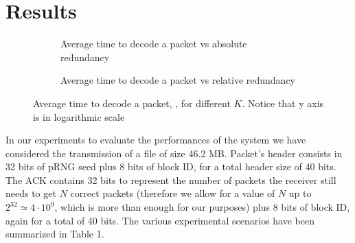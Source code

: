 \section{Results}\label{sec:results}
\setlength{\abovecaptionskip}{0pt plus 0pt minus 2pt}

\begin{figure}[t!]
\centering
\captionsetup{justification=centering,font=scriptsize}
\begin{subfigure}{0.4\textwidth}
	\captionsetup{justification=centering,font=scriptsize}
	\setlength{}
	\setlength{}
	
	\caption{Average time to decode a packet vs absolute redundancy}
	\label{fig:decoding_time}
\end{subfigure}\hspace{2em}%
\begin{subfigure}{0.4\textwidth}
	\captionsetup{justification=centering,font=scriptsize}
	\setlength{}
	\setlength{}
	
	\caption{Average time to decode a packet vs relative redundancy}
	\label{fig:decoding_time_rel}
\end{subfigure}
\caption{Average time to decode a packet, , for different $K$. Notice that y axis is in logarithmic scale}
\label{fig:dc_all}
\end{figure}

In our experiments to evaluate the performances of the system we have considered the transmission of a file of size 46.2 MB. Packet's header consists in 32 bits of pRNG seed plus 8 bits of block ID, for a total header size of 40 bits. The ACK contains 32 bits to represent the number of packets the receiver still needs to get $N$ correct packets (therefore we allow for a value of $N$ up to $2^{32}\simeq 4\cdot 10^9$, which is more than enough for our purposes) plus 8 bits of block ID, again for a total of 40 bits. The various experimental scenarios have been summarized in Table 1.

